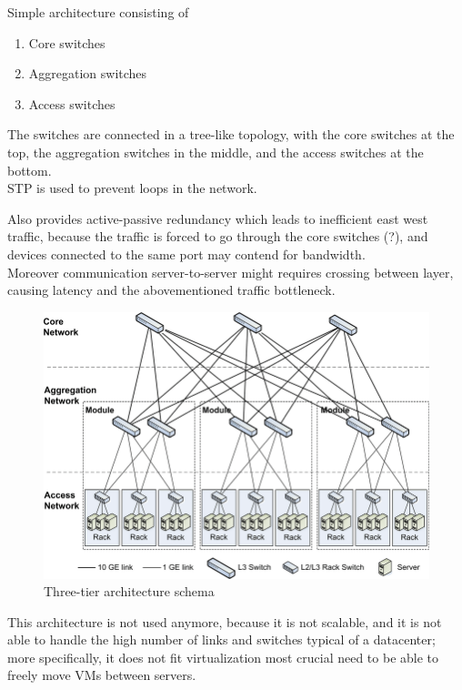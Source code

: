 \begin{paracol}{2}
   
   Simple architecture consisting of\ns
   \begin{enumerate}
      \item Core switches
      \item Aggregation switches
      \item Access switches
   \end{enumerate}\ns
   The switches are connected in a tree-like topology, with the core switches at the top, the aggregation switches in the middle, and the access switches at the bottom.\\
   STP is used to prevent loops in the network.

   Also provides active-passive redundancy which leads to inefficient east west traffic, because the traffic is forced to go through the core switches (?), and devices connected to the same port may contend for bandwidth.\\
   Moreover communication server-to-server might requires crossing between layer, causing latency and the abovementioned traffic bottleneck.
   
   \switchcolumn
   
   \colfill
   \begin{figure}[htbp]
      \centering
      \includegraphics{images/3tier_switches.png}
      \caption{Three-tier architecture schema}
      \label{fig:3tier_switches}
   \end{figure}
   \colfill
   
\end{paracol}
This architecture is not used anymore, because it is not scalable, and it is not able to handle the high number of links and switches typical of a datacenter; more specifically, it does not fit virtualization most crucial need to be able to freely move VMs between servers.

